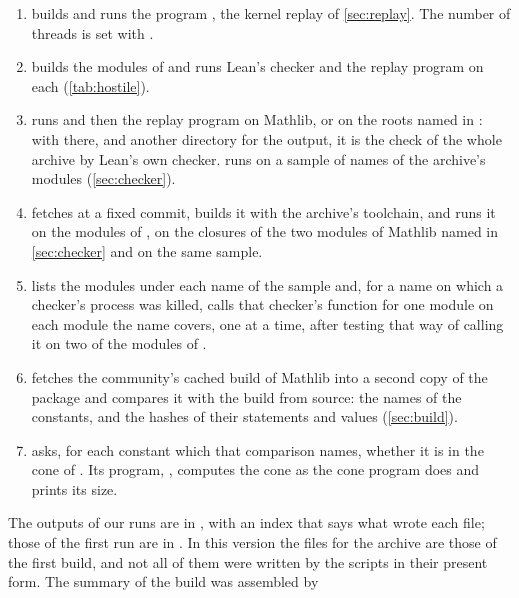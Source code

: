 \begin{enumerate}
  dependency cone of \cref{sec:cone} and writes the list of every declaration of the archive
  inside it and outside it.
\item {} builds and runs the program , the kernel
  replay of \cref{sec:replay}. The number of threads is set with .
\item {} builds the modules of  and runs Lean's checker and the
  replay program on each (\cref{tab:hostile}).
\item {} runs  and then the replay program on
  Mathlib, or on the roots named in : with  there, and another
  directory for the output, it is the check of the whole archive by Lean's own checker.
   runs  on a sample of names of the archive's modules
  (\cref{sec:checker}).
\item {} fetches  at a fixed commit, builds it with the
  archive's toolchain, and runs it on the modules of , on the closures of the
  two modules of Mathlib named in \cref{sec:checker} and on the same sample.
\item {} lists the modules under each name of the sample and, for a
  name on which a checker's process was killed, calls that checker's function for one
  module on each module the name covers, one at a time, after testing that way of calling
  it on two of the modules of .
\item {} fetches the community's cached build of Mathlib into a second
  copy of the package and compares it with the build from source: the names of the
  constants, and the hashes of their statements and values (\cref{sec:build}).
\item {} asks, for each constant which that comparison names, whether it
  is in the cone of . Its program, ,
  computes the cone as the cone program does and prints its size.
\end{enumerate}
The outputs of our runs are in , with an index that says what
wrote each file\ifsecondrun; those of the first run are in \fi.
\ifsecondrun\else
In this version the files for the archive are those of the first build, and not all of them
were written by the scripts in their present form. The summary of the build was assembled by
